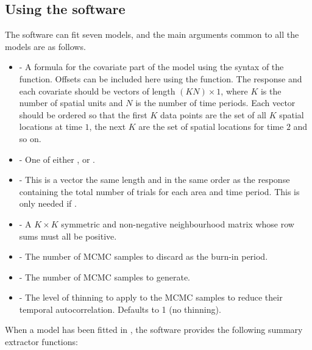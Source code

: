 \documentclass[article, nojss]{jss}
\begin{document}
\subsection{Using the software}
The software can fit  seven models, and the main arguments common to all the models are as follows.

\begin{itemize}
\item {} - A formula for the covariate part of the model using the syntax of the  function. Offsets can be included here using the  function. The response and each covariate should be vectors of length $(KN)\times 1$, where $K$ is the number of spatial units and $N$ is the number of time periods. Each vector should be ordered so that the first $K$ data points are the set of all $K$ spatial locations at time $1$, the next $K$ are the set of spatial locations for time $2$ and so on. 

\item {} - One of either ,  or .


\item {} - This is a vector the same length and in the same order as the response containing the total number of trials  for each area and time period. This is only needed if  .

\item {} - A $K \times K$ symmetric and non-negative neighbourhood matrix whose row sums must all be positive.

\item {} - The number of MCMC samples to discard as the burn-in period.
    
\item {} - The number of MCMC samples to generate.

\item {} - The level of thinning to apply to the MCMC samples to reduce their temporal 
autocorrelation. Defaults to 1 (no thinning).
\end{itemize}

When a model has been fitted in , the software provides the following summary extractor functions: 
\end{document}
